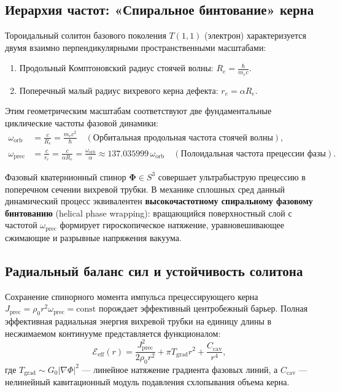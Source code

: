 \documentclass[12pt,a4paper]{article}
\begin{document}
	\subsection{Иерархия частот: «Спиральное бинтование» керна}
	Тороидальный солитон базового поколения $T(1,1)$ (электрон) характеризуется двумя взаимно перпендикулярными пространственными масштабами:
	\begin{enumerate}
		\item Продольный Комптоновский радиус стоячей волны: $R_e = \frac{\hbar}{m_e c}$.
		\item Поперечный малый радиус вихревого керна дефекта: $r_e = \alpha R_e$.
	\end{enumerate}
	
	Этим геометрическим масштабам соответствуют две фундаментальные циклические частоты фазовой динамики:
	\begin{align}
		\omega_{\text{orb}} &= \frac{c}{R_e} = \frac{m_e c^2}{\hbar} \quad (\text{Орбитальная продольная частота стоячей волны}), \\
		\omega_{\text{prec}} &= \frac{c}{r_e} = \frac{c}{\alpha R_e} = \frac{\omega_{\text{orb}}}{\alpha} \approx 137.035999 \, \omega_{\text{orb}} \quad (\text{Полоидальная частота прецессии фазы}).
	\end{align}
	
	Фазовый кватернионный спинор $\boldsymbol{\Phi} \in S^3$ совершает ультрабыструю прецессию в поперечном сечении вихревой трубки. В механике сплошных сред данный динамический процесс эквивалентен \textbf{высокочастотному спиральному фазовому бинтованию} (helical phase wrapping): вращающийся поверхностный слой с частотой $\omega_{\text{prec}}$ формирует гироскопическое натяжение, уравновешивающее сжимающие и разрывные напряжения вакуума.
	
	\subsection{Радиальный баланс сил и устойчивость солитона}
	Сохранение спинорного момента импульса прецессирующего керна $J_{\text{prec}} = \rho_0 r^2 \omega_{\text{prec}} = \text{const}$ порождает эффективный центробежный барьер. Полная эффективная радиальная энергия вихревой трубки на единицу длины в несжимаемом континууме представляется функционалом:
	\begin{equation}
		\mathcal{E}_{\text{eff}}(r) = \frac{J_{\text{prec}}^2}{2 \rho_0 r^2} + \pi T_{\text{grad}} r^2 + \frac{C_{\text{cav}}}{r^4},
	\end{equation}
	где $T_{\text{grad}} \sim G_0 |\nabla \Phi|^2$ --- линейное натяжение градиента фазовых линий, а $C_{\text{cav}}$ --- нелинейный кавитационный модуль подавления схлопывания объема керна.
	
\end{document}
